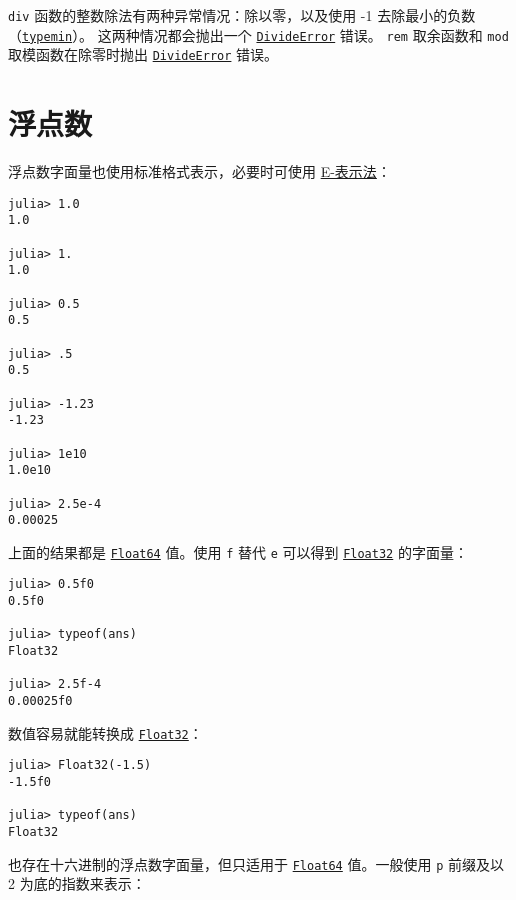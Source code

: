 \texttt{div} 函数的整数除法有两种异常情况：除以零，以及使用 -1 去除最小的负数（\hyperlink{3613894539247233488}{\texttt{typemin}}）。 这两种情况都会抛出一个 \hyperlink{4168463413201806292}{\texttt{DivideError}} 错误。 \texttt{rem} 取余函数和 \texttt{mod} 取模函数在除零时抛出 \hyperlink{4168463413201806292}{\texttt{DivideError}} 错误。



\hypertarget{7313324545649063110}{}


\section{浮点数}



浮点数字面量也使用标准格式表示，必要时可使用 \href{https://en.wikipedia.org/wiki/Scientific\_notation\#E-notation}{E-表示法}：




\begin{verbatim}
julia> 1.0
1.0

julia> 1.
1.0

julia> 0.5
0.5

julia> .5
0.5

julia> -1.23
-1.23

julia> 1e10
1.0e10

julia> 2.5e-4
0.00025
\end{verbatim}



上面的结果都是 \hyperlink{5027751419500983000}{\texttt{Float64}} 值。使用 \texttt{f} 替代 \texttt{e} 可以得到 \hyperlink{8101639384272933082}{\texttt{Float32}} 的字面量：




\begin{verbatim}
julia> 0.5f0
0.5f0

julia> typeof(ans)
Float32

julia> 2.5f-4
0.00025f0
\end{verbatim}



数值容易就能转换成 \hyperlink{8101639384272933082}{\texttt{Float32}}：




\begin{verbatim}
julia> Float32(-1.5)
-1.5f0

julia> typeof(ans)
Float32
\end{verbatim}



也存在十六进制的浮点数字面量，但只适用于 \hyperlink{5027751419500983000}{\texttt{Float64}} 值。一般使用 \texttt{p} 前缀及以 2 为底的指数来表示：




